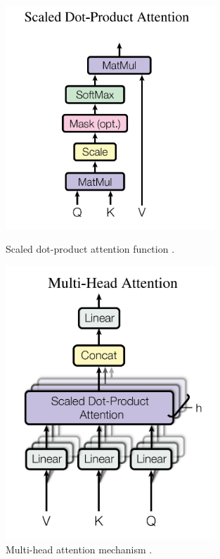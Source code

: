 \documentclass[english, 12pt, a4paper, elec, utf8, a-2b, online]{aaltothesis}
\begin{document}

\begin{figure}[H]
    \centering
    \begin{minipage}{.5\textwidth}
        \centering
        \includegraphics[width=0.7\textwidth]{images/attention_qkv.png}
        \caption{Scaled dot-product attention function \cite{Vaswani2017}.}
        \label{fig:attention_qkv}
    \end{minipage}%
    \begin{minipage}{.5\textwidth}
        \centering
        \includegraphics[width=0.7\textwidth]{images/multihead_attention.png}
        \caption{Multi-head attention mechanism \cite{Vaswani2017}.}
        \label{fig:multihead_attention}
    \end{minipage}
\end{figure}
\end{document}
